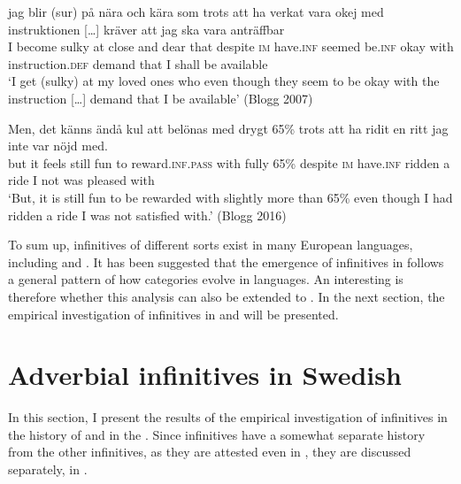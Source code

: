 \documentclass[output=paper]{langscibook}
\begin{document}
\ea
\label{ex:kalm:7}
\ea  \label{ex:kalm:7a}
\gll jag blir (sur) på nära och kära som trots att ha verkat vara okej med {instruktionen […]} kräver att jag ska vara anträffbar\\
I become sulky at close and dear that despite \textsc{im} have.\textsc{inf} seemed be.\textsc{inf} okay with instruction.\textsc{def} demand that I shall be available\\ 
\glt ‘I get (sulky) at my loved ones who even though they seem to be okay with the instruction […] demand that I be available’ (Blogg 2007)

\ex  \label{ex:kalm:7b}
\gll Men, det känns ändå kul att belönas med drygt 65\% trots att ha ridit en ritt jag inte var nöjd med.\\
but it feels still fun to reward.\textsc{inf.pass} with fully 65\% despite \textsc{im} have.\textsc{inf} ridden a ride I not was pleased with\\ 
\glt ‘But, it is still fun to be rewarded with slightly more than 65\% even though I had ridden a ride I was not satisfied with.’ (Blogg 2016)
\z 
\z 



To sum up,  infinitives of different sorts exist in many European languages, including  and . It has been suggested that the emergence of  infinitives in  follows a general pattern of how  categories evolve in languages. An interesting  is therefore whether this analysis can also be extended to . In the next section, the empirical investigation of  infinitives in  and  will be presented. 


\section{Adverbial infinitives in Swedish}\label{sec:kalm:4}
In this section, I present the results of the empirical investigation of  infinitives in the history of  and in the  . Since  infinitives have a somewhat separate history from the other  infinitives, as they are attested even in , they are discussed separately, in .
\end{document}
